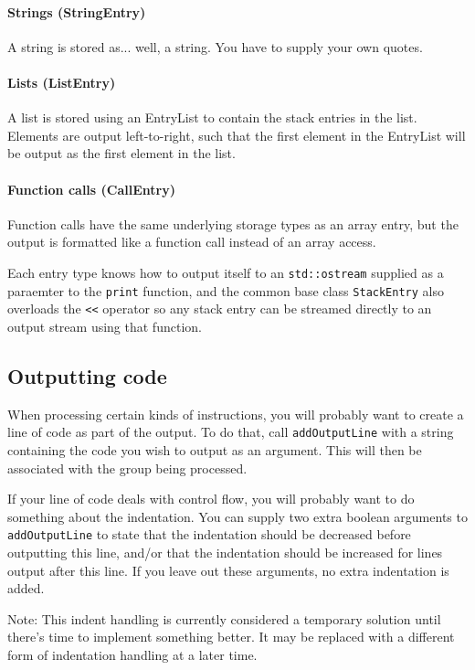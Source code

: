 \paragraph{Strings (StringEntry)}
A string is stored as... well, a string. You have to supply your own quotes.

\paragraph{Lists (ListEntry)}
A list is stored using an EntryList to contain the stack entries in the list. Elements are output left-to-right, such that the first element in the EntryList will be output as the first element in the list.

\paragraph{Function calls (CallEntry)}
Function calls have the same underlying storage types as an array entry, but the output is formatted like a function call instead of an array access.

Each entry type knows how to output itself to an \verb+std::ostream+ supplied as a paraemter to the \verb+print+ function, and the common base class \verb+StackEntry+ also overloads the \verb+<<+ operator so any stack entry can be streamed directly to an output stream using that function.

\subsection{Outputting code}
When processing certain kinds of instructions, you will probably want to create a line of code as part of the output. To do that, call \verb+addOutputLine+ with a string containing the code you wish to output as an argument. This will then be associated with the group being processed.

If your line of code deals with control flow, you will probably want to do something about the indentation. You can supply two extra boolean arguments to \verb+addOutputLine+ to state that the indentation should be decreased before outputting this line, and/or that the indentation should be increased for lines output after this line. If you leave out these arguments, no extra indentation is added.

Note: This indent handling is currently considered a temporary solution until there's time to implement something better. It may be replaced with a different form of indentation handling at a later time.

